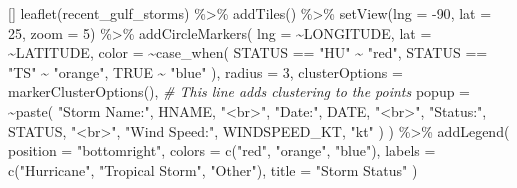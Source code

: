\documentclass[12pt,letterpaper]{article}
\newenvironment{Shaded}{\begin{snugshade}}{\end{snugshade}}
\newenvironment{Highlighting}{}{}
\newcommand{\DecValTok}[1]{\textcolor[rgb]{0.00,0.00,0.81}{#1}}
\newcommand{\StringTok}[1]{\textcolor[rgb]{0.31,0.60,0.02}{#1}}
\newcommand{\CommentTok}[1]{\textcolor[rgb]{0.56,0.35,0.01}{\textit{#1}}}
\newcommand{\FunctionTok}[1]{\textcolor[rgb]{0.00,0.00,0.00}{#1}}
\newcommand{\NormalTok}[1]{#1}
\newcommand{\ConstantTok}[1]{\textcolor[rgb]{0.00,0.00,0.00}{#1}}
\newcommand{\SpecialCharTok}[1]{\textcolor[rgb]{0.00,0.00,0.00}{#1}}
\newcommand{\AttributeTok}[1]{\textcolor[rgb]{0.77,0.63,0.00}{#1}}
\begin{document}
\begin{Shaded}
\begin{Highlighting}[]
\FunctionTok{leaflet}\NormalTok{(recent\_gulf\_storms) }\SpecialCharTok{\%\textgreater{}\%}
  \FunctionTok{addTiles}\NormalTok{() }\SpecialCharTok{\%\textgreater{}\%}
  \FunctionTok{setView}\NormalTok{(}\AttributeTok{lng =} \SpecialCharTok{{-}}\DecValTok{90}\NormalTok{, }\AttributeTok{lat =} \DecValTok{25}\NormalTok{, }\AttributeTok{zoom =} \DecValTok{5}\NormalTok{) }\SpecialCharTok{\%\textgreater{}\%}
  \FunctionTok{addCircleMarkers}\NormalTok{(}
    \AttributeTok{lng =} \SpecialCharTok{\textasciitilde{}}\NormalTok{LONGITUDE,}
    \AttributeTok{lat =} \SpecialCharTok{\textasciitilde{}}\NormalTok{LATITUDE,}
    \AttributeTok{color =} \SpecialCharTok{\textasciitilde{}}\FunctionTok{case\_when}\NormalTok{(}
\NormalTok{      STATUS }\SpecialCharTok{==} \StringTok{"HU"} \SpecialCharTok{\textasciitilde{}} \StringTok{"red"}\NormalTok{,}
\NormalTok{      STATUS }\SpecialCharTok{==} \StringTok{"TS"} \SpecialCharTok{\textasciitilde{}} \StringTok{"orange"}\NormalTok{,}
      \ConstantTok{TRUE} \SpecialCharTok{\textasciitilde{}} \StringTok{"blue"}
\NormalTok{    ),}
    \AttributeTok{radius =} \DecValTok{3}\NormalTok{,}
    \AttributeTok{clusterOptions =} \FunctionTok{markerClusterOptions}\NormalTok{(), }\CommentTok{\# This line adds clustering to the points}
    \AttributeTok{popup =} \SpecialCharTok{\textasciitilde{}}\FunctionTok{paste}\NormalTok{(}
      \StringTok{"Storm Name:"}\NormalTok{, HNAME, }\StringTok{"\textless{}br\textgreater{}"}\NormalTok{,}
      \StringTok{"Date:"}\NormalTok{, DATE, }\StringTok{"\textless{}br\textgreater{}"}\NormalTok{,}
      \StringTok{"Status:"}\NormalTok{, STATUS, }\StringTok{"\textless{}br\textgreater{}"}\NormalTok{,}
      \StringTok{"Wind Speed:"}\NormalTok{, WINDSPEED\_KT, }\StringTok{"kt"}
\NormalTok{    )}
\NormalTok{  ) }\SpecialCharTok{\%\textgreater{}\%}
  \FunctionTok{addLegend}\NormalTok{(}
    \AttributeTok{position =} \StringTok{"bottomright"}\NormalTok{,}
    \AttributeTok{colors =} \FunctionTok{c}\NormalTok{(}\StringTok{"red"}\NormalTok{, }\StringTok{"orange"}\NormalTok{, }\StringTok{"blue"}\NormalTok{),}
    \AttributeTok{labels =} \FunctionTok{c}\NormalTok{(}\StringTok{"Hurricane"}\NormalTok{, }\StringTok{"Tropical Storm"}\NormalTok{, }\StringTok{"Other"}\NormalTok{),}
    \AttributeTok{title =} \StringTok{"Storm Status"}
\NormalTok{  )}
\end{Highlighting}
\end{Shaded}
\end{document}
